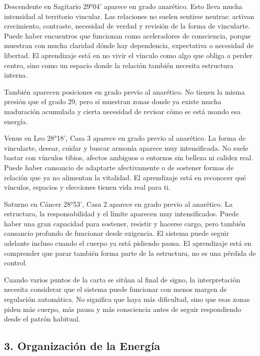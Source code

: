 \documentclass[11pt,a4paper]{article}\usepackage[utf8]{inputenc}
\begin{document}
Descendente en Sagitario 29°04' aparece en grado anarético. Esto lleva mucha intensidad al territorio vincular. Las relaciones no suelen sentirse neutras: activan crecimiento, contraste, necesidad de verdad y revisión de la forma de vincularte. Puede haber encuentros que funcionan como aceleradores de consciencia, porque muestran con mucha claridad dónde hay dependencia, expectativa o necesidad de libertad. El aprendizaje está en no vivir el vínculo como algo que obliga a perder centro, sino como un espacio donde la relación también necesita estructura interna.

También aparecen posiciones en grado previo al anarético. No tienen la misma presión que el grado 29, pero sí muestran zonas donde ya existe mucha maduración acumulada y cierta necesidad de revisar cómo se está usando esa energía.

Venus en Leo 28°18', Casa 3 aparece en grado previo al anarético. La forma de vincularte, desear, cuidar y buscar armonía aparece muy intensificada. No suele bastar con vínculos tibios, afectos ambiguos o entornos sin belleza ni calidez real. Puede haber cansancio de adaptarte afectivamente o de sostener formas de relación que ya no alimentan la vitalidad. El aprendizaje está en reconocer qué vínculos, espacios y elecciones tienen vida real para ti.

Saturno en Cáncer 28°53', Casa 2 aparece en grado previo al anarético. La estructura, la responsabilidad y el límite aparecen muy intensificados. Puede haber una gran capacidad para sostener, resistir y hacerse cargo, pero también cansancio profundo de funcionar desde exigencia. El sistema puede seguir adelante incluso cuando el cuerpo ya está pidiendo pausa. El aprendizaje está en comprender que parar también forma parte de la estructura, no es una pérdida de control.

Cuando varios puntos de la carta se sitúan al final de signo, la interpretación necesita considerar que el sistema puede funcionar con menos margen de regulación automática. No significa que haya más dificultad, sino que esas zonas piden más cuerpo, más pausa y más consciencia antes de seguir respondiendo desde el patrón habitual.



\subsection{3. Organización de la Energía}
\end{document}
